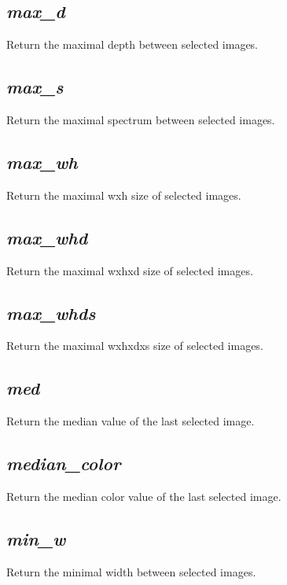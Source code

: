\documentclass[a4paper,10.5pt,twoside]{book}
\begin{document}
\subsection{\emph{max\_d} }\vspace*{-0.7em}
Return the maximal depth between selected images.


\subsection{\emph{max\_s} }\vspace*{-0.7em}
Return the maximal spectrum between selected images.


\subsection{\emph{max\_wh} }\vspace*{-0.7em}
Return the maximal wxh size of selected images.


\subsection{\emph{max\_whd} }\vspace*{-0.7em}
Return the maximal wxhxd size of selected images.


\subsection{\emph{max\_whds} }\vspace*{-0.7em}
Return the maximal wxhxdxs size of selected images.


\subsection{\emph{med} }\vspace*{-0.7em}
Return the median value of the last selected image.


\subsection{\emph{median\_color} }\vspace*{-0.7em}
Return the median color value of the last selected image.


\subsection{\emph{min\_w} }\vspace*{-0.7em}
Return the minimal width between selected images.
\end{document}

